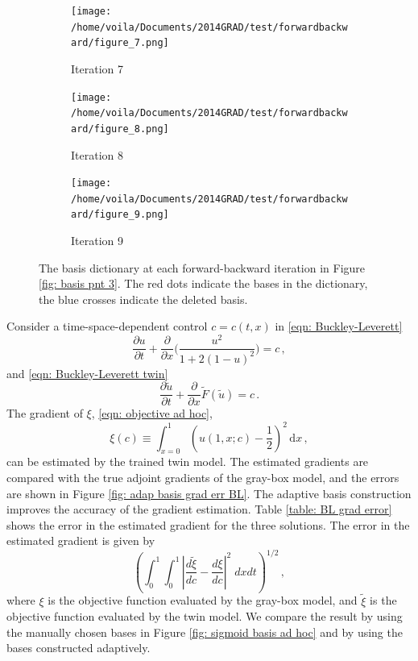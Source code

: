 \begin{figure}[htbp]
\begin{center}
    \begin{subfigure}[t]{.32\textwidth}
        \centering
        \texttt{[image: /home/voila/Documents/2014GRAD/test/forwardbackward/figure\_7.png]}
        \caption{Iteration 7}
        \label{fig: basis history 7}
    \end{subfigure}
    \begin{subfigure}[t]{.32\textwidth}     
        \centering
        \texttt{[image: /home/voila/Documents/2014GRAD/test/forwardbackward/figure\_8.png]}
        \caption{Iteration 8}
        \label{fig: basis history 8}
    \end{subfigure}
    \begin{subfigure}[t]{.32\textwidth}
        \centering
        \texttt{[image: /home/voila/Documents/2014GRAD/test/forwardbackward/figure\_9.png]}
        \caption{Iteration 9}
        \label{fig: basis history 9}
    \end{subfigure}   
    \caption{The basis dictionary at each forward-backward iteration in Figure \ref{fig: basis pnt 3}. 
             The red dots indicate the bases in the dictionary, the blue crosses indicate the deleted
             basis.}
    \label{fig: basis history}
\end{center}\end{figure}


Consider a time-space-dependent control $c=c(t,x)$ in \eqref{eqn: Buckley-Leverett} 
\begin{equation*}
    \frac{\partial u}{\partial t} + \frac{\partial}{\partial x}\Big(
    \frac{u^2}{1+ 2(1-u)^2} \Big) = c\,,
\end{equation*}
and 
\eqref{eqn: Buckley-Leverett twin}
\begin{equation*}
    \frac{\partial \tilde{u}}{\partial t} + \frac{\partial}{\partial x}\tilde{F}(\tilde{u})
    = c\,.
\end{equation*}
The gradient of $\xi$, \eqref{eqn: objective ad hoc}, 
\begin{equation*}
    \xi(c) \equiv \int_{x=0}^1 \left(u(1,x; c) - \frac{1}{2}\right)^2 \,\textrm{d}x\,,
\end{equation*}
can be estimated by the trained twin model. The estimated gradients are compared with the true adjoint
gradients of the gray-box model, and the errors are shown in Figure \ref{fig: adap basis grad err BL}.
The adaptive basis construction improves the accuracy of the gradient estimation.
Table \ref{table: BL grad error} shows the error in the estimated gradient for
the three solutions.
The error in the estimated gradient is given by
\begin{equation*}
    \left(\int_0^1 \int_0^1 \left|\frac{d\tilde{\xi}}{dc} -\frac{d\xi}{dc} \right|^2 \; dxdt\right)^{1/2}\,,
\end{equation*}
where $\xi$ is the objective function evaluated by the gray-box model, and 
$\tilde{\xi}$ is the objective function evaluated by the twin model.
We compare the result by using the manually chosen bases in Figure
\ref{fig: sigmoid basis ad hoc} and by using the bases constructed adaptively.\\

